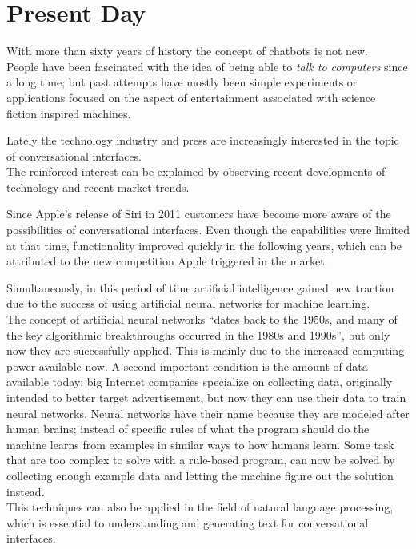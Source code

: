 \section{Present Day}
\label{presentday}


With more than sixty years of history the concept of chatbots is not new.
\\
People have been fascinated with the idea of being able to \emph{talk to computers} since a long time; but past attempts have mostly been simple experiments or applications focused on the aspect of entertainment associated with science fiction inspired machines.

Lately the technology industry and press are increasingly interested in the topic of conversational interfaces.
\\
The reinforced interest can be explained by observing recent developments of technology and recent market trends.

Since Apple's release of Siri in 2011\cite{iphonelaunch} customers have become more aware of the possibilities of conversational interfaces. Even though the capabilities were limited at that time, functionality improved quickly in the following years, which can be attributed to the new competition Apple triggered in the market.

Simultaneously, in this period of time artificial intelligence gained new traction due to the success of using artificial neural networks for machine learning\cite{mltrend}.
\\
The concept of artificial neural networks ``dates back to the 1950s, and many of the key algorithmic breakthroughs occurred in the 1980s and 1990s''\cite{airevolution}, but only now they are successfully applied. This is mainly due to the increased computing power available now. A second important condition is the amount of data available today; big Internet companies specialize on collecting data, originally intended to better target advertisement, but now they can use their data to train neural networks. Neural networks have their name because they are modeled after human brains; instead of specific rules of what the program should do the machine learns from examples in similar ways to how humans learn. Some task that are too complex to solve with a rule-based program, can now be solved by collecting enough example data and letting the machine figure out the solution instead.
\\
This techniques can also be applied in the field of natural language processing, which is essential to understanding and generating text for conversational interfaces.
\\

